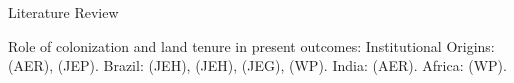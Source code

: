 \documentclass[aspectratio=1610]{beamer}
\begin{document}
\begin{frame}{Literature Review}
    \begin{outline}
        \1 Role of colonization and land tenure in present outcomes:
            \vspace{2mm}
            \2 Institutional Origins: \cite{Acemoglu2001-dz} (AER), \cite{Sokoloff2000-mb} (JEP). 
            \vspace{2mm}
            \2 Brazil: \cite{Naritomi2012-or} (JEH), 
            \cite{Musacchio2014-pq} (JEH),
            \cite{Wigton-Jones2020-ex} (JEG),
            \cite{Laudares2022-vy} (WP).
            \vspace{2mm}
            \2 India: \cites{Banerjee2005-ki} (AER).
            \vspace{2mm}
            \2 Africa: \cites{Lowes2020-pr} (WP).
    \end{outline}
\end{frame}
\end{document}
